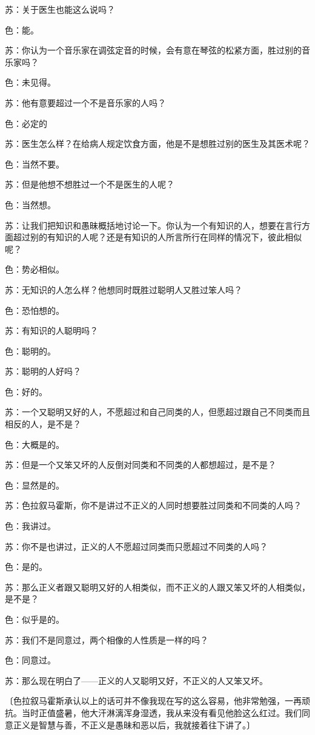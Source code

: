 \documentclass[12pt,oneside]{book}
\begin{document}
苏：关于医生也能这么说吗？

色：能。

苏：你认为一个音乐家在调弦定音的时候，会有意在琴弦的松紧方面，胜过别的音乐家吗？

色：未见得。

苏：他有意要超过一个不是音乐家的人吗？

色：必定的

苏：医生怎么样？在给病人规定饮食方面，他是不是想胜过别的医生及其医术呢？

色：当然不要。

苏：但是他想不想胜过一个不是医生的人呢？

色：当然想。

苏：让我们把知识和愚昧概括地讨论一下。你认为一个有知识的人，想要在言行方面超过别的有知识的人呢？还是有知识的人所言所行在同样的情况下，彼此相似呢？

色：势必相似。

苏：无知识的人怎么样？他想同时既胜过聪明人又胜过笨人吗？

色：恐怕想的。

苏：有知识的人聪明吗？

色：聪明的。

苏：聪明的人好吗？

色：好的。

苏：一个又聪明又好的人，不愿超过和自己同类的人，但愿超过跟自己不同类而且相反的人，是不是？

色：大概是的。

苏：但是一个又笨又坏的人反倒对同类和不同类的人都想超过，是不是？

色：显然是的。

苏：色拉叙马霍斯，你不是讲过不正义的人同时想要胜过同类和不同类的人吗？

色：我讲过。

苏：你不是也讲过，正义的人不愿超过同类而只愿超过不同类的人吗？

色：是的。

苏：那么正义者跟又聪明又好的人相类似，而不正义的人跟又笨又坏的人相类似，是不是？

色：似乎是的。

苏：我们不是同意过，两个相像的人性质是一样的吗？

色：同意过。

苏：那么现在明白了——正义的人又聪明又好，不正义的人又笨又坏。

〔色拉叙马霍斯承认以上的话可并不像我现在写的这么容易，他非常勉强，一再顽抗。当时正值盛暑，他大汗淋漓浑身湿透，我从来没有看见他脸这么红过。我们同意正义是智慧与善，不正义是愚昧和恶以后，我就接着往下讲了。〕
\end{document}
